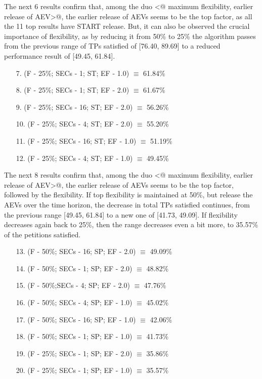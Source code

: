 The next 6 results confirm that, among the duo \verb@<@ maximum flexibility, earlier release of AEV\verb@>@, the earlier release of AEVs seems to be the top factor, as all the 11 top results have START release. But, it can also be observed the crucial importance of flexibility, as by reducing it from 50\% to 25\% the algorithm passes from the previous range of TPs satisfied of [76.40, 89.69] to a reduced performance result of [49.45, 61.84].
\begin{enumerate}
\item[7.] (F - 25\%; SECs - 1; ST; EF - 1.0) $\equiv$ 61.84\%
\item[8.] (F - 25\%; SECs - 1; ST; EF - 2.0) $\equiv$ 61.67\%
\item[9.] (F - 25\%; SECs - 16; ST; EF - 2.0) $\equiv$ 56.26\%
\item[10.] (F - 25\%; SECs - 4; ST; EF - 2.0) $\equiv$ 55.20\%
\item[11.] (F - 25\%; SECs - 16; ST; EF - 1.0) $\equiv$ 51.19\%
\item[12.] (F - 25\%; SECs - 4; ST; EF - 1.0) $\equiv$ 49.45\%
\end{enumerate}

The next 8 results confirm that, among the duo \verb@<@ maximum flexibility, earlier release of AEV\verb@>@, the earlier release of AEVs seems to be the top factor, followed by the flexibility.
If top flexibility is maintained at 50\%, but release the AEVs over the time horizon, the decrease in total TPs satisfied continues, from the previous range [49.45, 61.84] to a new one of [41.73, 49.09].
If flexibility decreases again back to 25\%, then the range decreases even a bit more, to 35.57\% of the petitions satisfied.
\begin{enumerate}
\item[13.] (F - 50\%; SECs - 16; SP; EF - 2.0) $\equiv$ 49.09\%
\item[14.] (F - 50\%; SECs - 1; SP; EF - 2.0) $\equiv$ 48.82\%
\item[15.] (F - 50\%;SECs - 4; SP; EF - 2.0) $\equiv$ 47.76\%
\item[16.] (F - 50\%; SECs - 4; SP; EF - 1.0) $\equiv$ 45.02\%
\item[17.] (F - 50\%; SECs - 16; SP; EF - 1.0) $\equiv$ 42.06\%
\item[18.] (F - 50\%; SECs - 1; SP; EF - 1.0) $\equiv$ 41.73\%
\item[19.] (F - 25\%; SECs - 1; SP; EF - 2.0) $\equiv$ 35.86\%
\item[20.] (F - 25\%; SECs - 1; SP; EF - 1.0) $\equiv$ 35.57\%
\end{enumerate}


